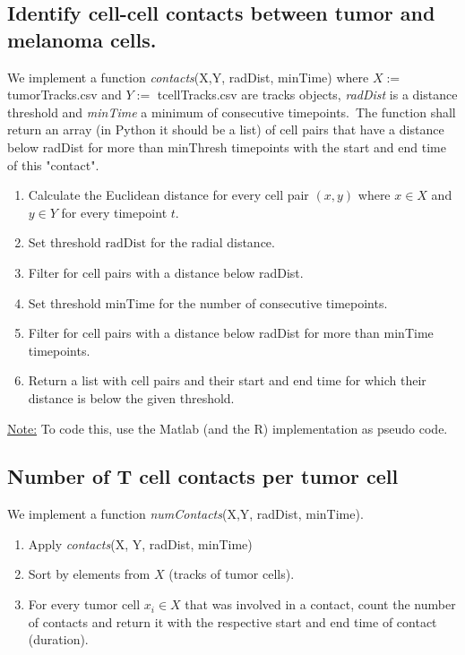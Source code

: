 \documentclass{report}
\begin{document}
\subsection{Identify cell-cell contacts between tumor and melanoma cells.}
\label{contacts(X,Y,radDist,minTime)}

We implement a function \textit{contacts}(X,Y, radDist, minTime) where $X:=$ tumorTracks.csv and $Y:=$ tcellTracks.csv are tracks objects, \textit{radDist} is a distance threshold and \textit{minTime} a minimum of consecutive timepoints.\
The function shall return an array (in Python it should be a list) of cell pairs that have a distance below radDist for more than minThresh timepoints with the start and end time of this "contact".

\begin{enumerate}
	\item Calculate the Euclidean distance for every cell pair $(x,y)$ where $x \in X$ and $y \in Y$ for every timepoint $t$.
	\item Set threshold $\text{radDist}$ for the radial distance.
	\item Filter for cell pairs with a distance below radDist.
	\item Set threshold $\text{minTime}$ for the number of consecutive timepoints.
	\item Filter for cell pairs with a distance below radDist for more than minTime timepoints. 
	\item Return a list with cell pairs and their start and end time for which their distance is below the given threshold.
\end{enumerate}

\underline{Note:} To code this, use the Matlab (and the R) implementation as pseudo code.

\subsection{Number of T cell contacts per tumor cell}
\label{tContactsPerCell(X,Y, radDist, minTime)}

We implement a function \textit{numContacts}(X,Y, radDist, minTime).

\begin{enumerate}
	\item Apply \textit{contacts}(X, Y, radDist, minTime)
	\item Sort by elements from $X$ (tracks of tumor cells).
	\item For every tumor cell $x_i\in X$ that was involved in a contact, count the number of contacts and return it with the respective start and end time of contact (duration).
\end{enumerate}
\end{document}
